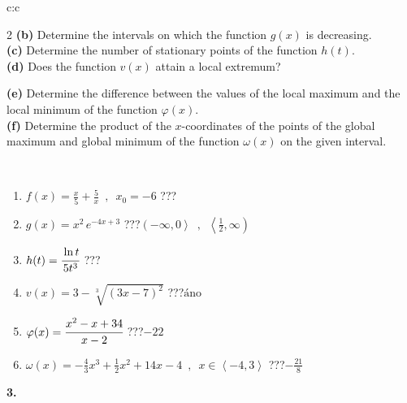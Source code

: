 \documentclass[10pt]{report}
\begin{document}
\begin{tabular}{c:c}
\begin{minipage}[c][104.5mm][t]{0.5\linewidth}
\begin{center}
\begin{minipage}{0.95\linewidth}
\begin{center}
{\begin{multicols}{2}
\textbf{(b)} Determine the intervals on which the function \(g(x)\) is decreasing. \\[1mm]
\textbf{(c)} Determine the number of stationary points of the function \(h(t)\). \\[1mm]
\textbf{(d)} Does the function \(v(x)\) attain a local extremum? \par \columnbreak
\textbf{(e)} Determine the difference between the values of the local maximum and the local minimum of the function \(\varphi(x)\). \\[1mm]
\textbf{(f)} Determine the product of the \(x\)-coordinates of the points of the global maximum and global minimum of the function \(\omega(x)\) on the given interval. \\[1mm]
\end{multicols}
}
\end{center}
\end{minipage}
\\[1mm]
\begin{minipage}{0.79\linewidth}
\begin{center}
\begin{varwidth}{\linewidth}
\setlength{\itemsep}{0pt}
\begin{enumerate}
\normalsize
\item $f(x)=\frac{x}{5}+\frac{5}{x} \enspace , \enspace x_0=-6$\quad \dotfill\; ???\;\dotfill \quad {}
\item $g(x)=x^2\, e^{-4x+3}$\quad \dotfill\; ???\;\dotfill \quad $\left(-\infty , 0\right\rangle\enspace , \enspace \left\langle\frac{1}{2} , \infty\right)$
\item $h(t)=\cfrac{\ln t}{5t^3}$\quad \dotfill\; ???\;\dotfill {}
\item $v(x)=3-\sqrt[3]{(3x-7)^2}$\quad \dotfill\; ???\;\dotfill \quad $\text{áno}$
\item $\varphi(x)=\cfrac{x^2-x+34}{x-2}$\quad \dotfill\; ???\;\dotfill \quad $-22$
\item $\omega(x)=-\frac{4}{3}x^3+\frac{1}{2}x^2+14x-4 \enspace , \enspace x\in\left\langle-4 , 3\right\rangle$\quad \dotfill\; ???\;\dotfill \quad $-\frac{21}{8}$
\end{enumerate}
\end{varwidth}
\end{center}
\end{minipage}
\begin{minipage}{0.20\linewidth}
\begin{center}
{\Huge\bfseries 3.} \\[2mm]

\end{center}
\end{minipage}
\end{center}
\end{minipage}
\end{tabular}
\end{document}
